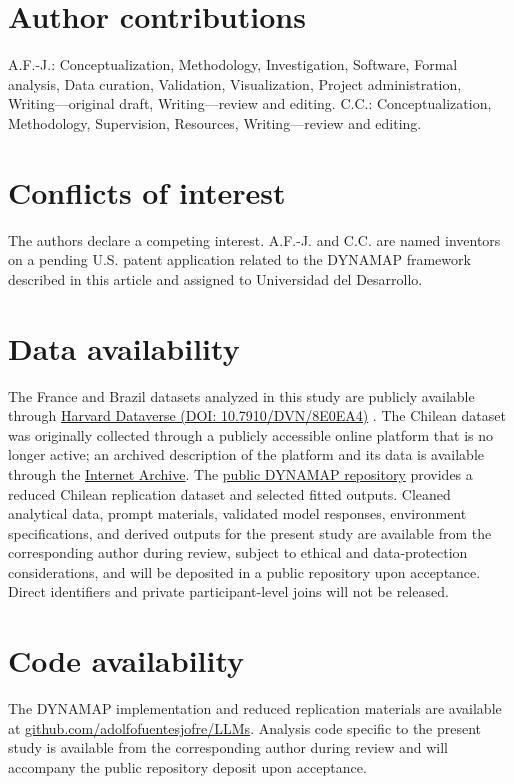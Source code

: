 \documentclass[unnumsec,webpdf,modern,large]{oup-authoring-template}
\begin{document}
\section*{Author contributions}

A.F.-J.: Conceptualization, Methodology, Investigation, Software, Formal analysis, Data curation, Validation, Visualization, Project administration, Writing---original draft, Writing---review and editing. C.C.: Conceptualization, Methodology, Supervision, Resources, Writing---review and editing.

\section*{Conflicts of interest}

The authors declare a competing interest. A.F.-J. and C.C. are named inventors on a pending U.S. patent application related to the DYNAMAP framework described in this article and assigned to Universidad del Desarrollo.

\section*{Data availability}

The France and Brazil datasets analyzed in this study are publicly available through \href{https://doi.org/10.7910/DVN/8E0EA4}{Harvard Dataverse (DOI: 10.7910/DVN/8E0EA4)} \citep{Navarrete2023Data}. The Chilean dataset was originally collected through a publicly accessible online platform that is no longer active; an archived description of the platform and its data is available through the \href{https://web.archive.org/web/20191229112008/https://chilecracia.org/datos}{Internet Archive}. The \href{https://github.com/adolfofuentesjofre/DYNAMAP}{public DYNAMAP repository} provides a reduced Chilean replication dataset and selected fitted outputs. Cleaned analytical data, prompt materials, validated model responses, environment specifications, and derived outputs for the present study are available from the corresponding author during review, subject to ethical and data-protection considerations, and will be deposited in a public repository upon acceptance. Direct identifiers and private participant-level joins will not be released.

\section*{Code availability}

The DYNAMAP implementation and reduced replication materials are available at \href{https://github.com/adolfofuentesjofre/LLMs_Compress_human_preference_geometry}{github.com/adolfofuentesjofre/LLMs}. Analysis code specific to the present study is available from the corresponding author during review and will accompany the public repository deposit upon acceptance.



\end{document}
